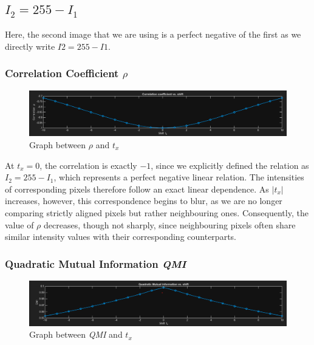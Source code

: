 \documentclass{report}
\begin{document}
\vspace{2em}

\subsection*{\boldmath$I_2 = 255 - I_1$}

Here, the second image that we are using is a perfect negative of the first as we directly write $I2 = 255 - I1$.

\subsubsection*{Correlation Coefficient \boldmath$\rho$}

\begin{figure}[h]
    \centering
    \includegraphics[width=\textwidth]{q4_1_corr.png}
    \caption{Graph between $\rho$ and $t_x$}
\end{figure}

At $t_x = 0$, the correlation is exactly $-1$, since we explicitly defined the relation as $I_2 = 255 - I_1$, which represents a perfect negative linear relation. The intensities of corresponding pixels therefore follow an exact linear dependence. As $|t_x|$ increases, however, this correspondence begins to blur, as we are no longer comparing strictly aligned pixels but rather neighbouring ones. Consequently, the value of $\rho$ decreases, though not sharply, since neighbouring pixels often share similar intensity values with their corresponding counterparts.

\vspace{1em}

\subsubsection*{Quadratic Mutual Information \textit{QMI}}

\begin{figure}[h]
    \centering
    \includegraphics[width=\textwidth]{q4_1_qmi.png}
    \caption{Graph between \textit{QMI} and $t_x$}
\end{figure}
\end{document}
